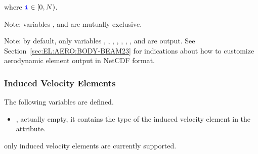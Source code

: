 where $\textcolor{blue}{\texttt{i}} \in [0,N)$.

\bigskip
\noindent
Note: variables ,  and 
are mutually exclusive.

\bigskip
\noindent
Note: by default, only variables
,
,
,
,
,
,
,
and  are output.
See Section~\ref{sec:EL:AERO:BODY-BEAM23} for indications
about how to customize aerodynamic element output in NetCDF format.

\subsubsection{Induced Velocity Elements}
\label{sec:NetCDF:Elem:InducedVelocity}

The following variables are defined.
\begin{itemize}
  \item {}, actually empty, it contains the type of 
    the induced velocity element in the  attribute.
\end{itemize}
only  induced velocity elements are currently supported.

